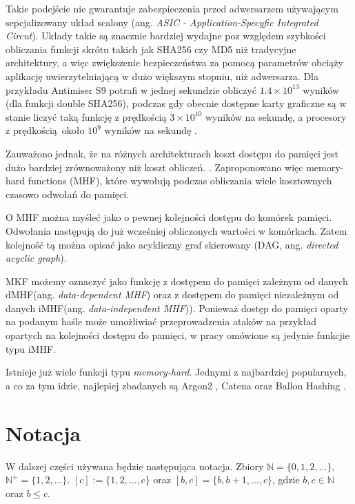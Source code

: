 Takie podejście nie gwarantuje zabezpieczenia przed adwersarzem używającym sepcjalizowany układ scalony (ang. \textit{ASIC - Application-Specyfic Integrated Circut}).
Układy takie są znacznie bardziej wydajne poz względem szybkości obliczania funkcji skrótu takich jak SHA256 czy MD5 niż tradycyjne architektury, a więc zwiększenie bezpieczeństwa za pomocą parametrów obciąży aplikację uwierzytelniającą w dużo większym stopniu, niż adwersarza.
Dla przykładu Antimiser S9 \cite{antminer} potrafi w jednej sekundzie obliczyć $1.4\times 10^{13}$ wyników (dla funkcji double SHA256), podczas gdy obecnie dostępne karty graficzne są w stanie liczyć taką funkcję z prędkością $3\times 10^{10}$ wyników na sekundę, a procesory z prędkością około $10^9$ wyników na sekundę \cite{rs}.

Zauważono jednak, że na różnych architekturach koszt dostępu do pamięci jest dużo bardziej zrównoważony niż koszt obliczeń. \cite{percival2009stronger}.
Zaproponowano więc memory-hard functions (MHF), które wywołują podczas obliczania wiele kosztownych czasowo odwołań do pamięci.

O MHF można myśleć jako o pewnej kolejności dostępu do komórek pamięci. Odwołania następują do już wcześniej obliczonych wartości w komórkach.
Zatem kolejność tą można opisać jako acykliczny graf skierowany (DAG, ang. \textit{directed acyclic graph}).

MKF możemy oznaczyć jako funkcję z dostępem do pamięci zależnym od danych dMHF(ang. \textit{data-dependent MHF}) oraz z dostępem do pamięci niezależnym od danych iMHF(ang. \textit{data-independent MHF})). Ponieważ dostęp do pamięci oparty na podanym haśle może umożliwiać przeprowadzenia ataków na przykład opartych na kolejności dostępu do pamięci, w pracy omówione są jedynie funkcjie typu iMHF.

Istnieje już wiele funkcji typu \textit{memory-hard}. Jednymi z najbardziej popularnych, a co za tym idzie, najlepiej zbadanych są Argon2 \cite{biryukov2016argon2}, Catena \cite{forler2013catena} oraz Ballon Hashing \cite{boneh2016balloon}.

\section{Notacja}

W dalszej części używana będzie następująca notacja.
Zbiory $\mathbb{N} = \{ 0,1,2,\dots \}$, $ \mathbb{N}^{+} = \{ 1, 2, \dots \}$.
$[c] := \{1, 2,\dots,c \}$ oraz $[b, c] = \{ b, b+1, \dots, c \}$, gdzie $b, c \in \mathbb{N}$ oraz $b \leq c$.

